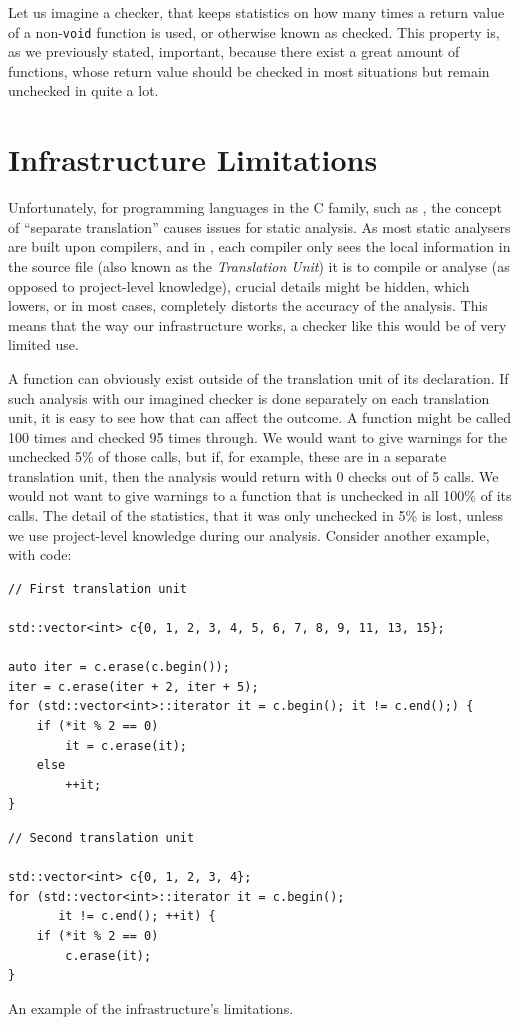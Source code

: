 Let us imagine a checker, that keeps statistics on how many times a return value of a non-\texttt{void} function is used, or otherwise known
as checked. This property is, as we previously stated, important, because there exist a great amount of functions,
whose return value should be checked in most situations but remain unchecked in quite a lot.

\section{Infrastructure Limitations}

Unfortunately, for programming languages in the C family, such as \CC{}, the concept of ``separate translation'' causes issues for static
analysis. As most static analysers are built upon compilers, and in \CC{}, each compiler only sees the local information in the source file
(also known as the \emph{Translation Unit}) it is to compile or analyse (as opposed to project-level knowledge), crucial details
might be hidden, which lowers, or in most cases, completely distorts the accuracy of the analysis.
This means that the way our infrastructure works, a checker like this would be of very limited use.

A function can obviously exist outside of the translation unit of its declaration. If such analysis with our imagined checker is done
separately on each translation unit, it is easy to see how that can affect the outcome. A function might be called 100 times and 
checked 95 times through. We would want to give warnings for the unchecked 5\% of those calls, but if, for example, these are in a 
separate translation unit, then the analysis would return with 0 checks out of 5 calls. We would not want to give warnings to a
function that is unchecked in all 100\% of its calls. The detail of the statistics, that it was only unchecked in 5\% is lost,
unless we use project-level knowledge during our analysis. Consider another example, with code:


\begin{listing}
    \begin{verbatim}
// First translation unit

std::vector<int> c{0, 1, 2, 3, 4, 5, 6, 7, 8, 9, 11, 13, 15};

auto iter = c.erase(c.begin());
iter = c.erase(iter + 2, iter + 5);
for (std::vector<int>::iterator it = c.begin(); it != c.end();) {
    if (*it % 2 == 0)
        it = c.erase(it);
    else
        ++it;
}
    \end{verbatim}

    \begin{verbatim}
// Second translation unit

std::vector<int> c{0, 1, 2, 3, 4};
for (std::vector<int>::iterator it = c.begin();
       it != c.end(); ++it) {
    if (*it % 2 == 0)
        c.erase(it);
}
    \end{verbatim}

    \caption{An example of the infrastructure's limitations.}\label{lst:motivation-example}
\end{listing}


